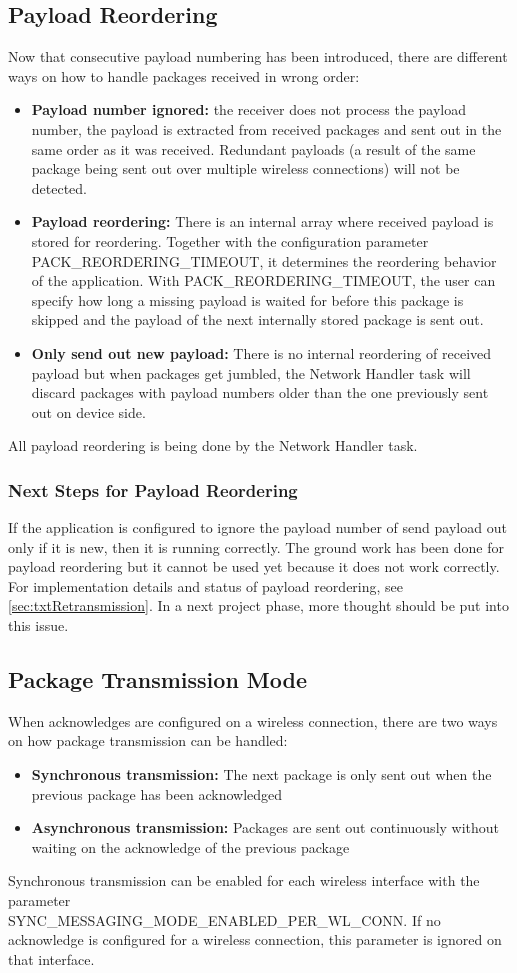 \subsection{Payload Reordering}
Now that consecutive payload numbering has been introduced, there are different ways on how to handle packages received in wrong order:
\begin{itemize}
    \item \textbf{Payload number ignored:} the receiver does not process the payload number, the payload is extracted from received packages and sent out in the same order as it was received. Redundant payloads (a result of the same package being sent out over multiple wireless connections) will not be detected.
    \item \textbf{Payload reordering:} There is an internal array where received payload is stored for reordering. Together with the configuration parameter PACK\_REORDERING\_TIMEOUT, it determines the reordering behavior of the application. With PACK\_REORDERING\_TIMEOUT, the user can specify how long a missing payload is waited for before this package is skipped and the payload of the next internally stored package is sent out.
    \item \textbf{Only send out new payload:} There is no internal reordering of received payload but when packages get jumbled, the Network Handler task will discard packages with payload numbers older than the one previously sent out on device side.
\end{itemize}
All payload reordering is being done by the Network Handler task.
%
\subsubsection{Next Steps for Payload Reordering}
If the application is configured to ignore the payload number of send payload out only if it is new, then it is running correctly. The ground work has been done for payload reordering but it cannot be used yet because it does not work correctly. For implementation details and status of payload reordering, see \autoref{sec:txtRetransmission}. In a next project phase, more thought should be put into this issue.
%
%
\subsection{Package Transmission Mode} \label{subsec:txtPackageTransmissionMode}
When acknowledges are configured on a wireless connection, there are two ways on how package transmission can be handled:
\begin{itemize}
    \item \textbf{Synchronous transmission:} The next package is only sent out when the previous package has been acknowledged
    \item \textbf{Asynchronous transmission:} Packages are sent out continuously without waiting on the acknowledge of the previous package
\end{itemize}
Synchronous transmission can be enabled for each wireless interface with the parameter\\ 
SYNC\_MESSAGING\_MODE\_ENABLED\_PER\_WL\_CONN. If no acknowledge is configured for a wireless connection, this parameter is ignored on that interface.
%
